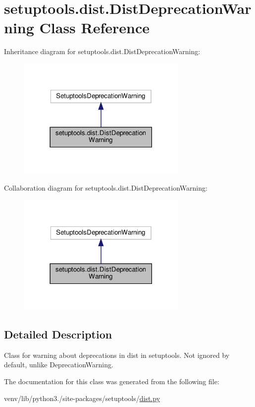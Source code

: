 \hypertarget{classsetuptools_1_1dist_1_1DistDeprecationWarning}{}\section{setuptools.\+dist.\+Dist\+Deprecation\+Warning Class Reference}
\label{classsetuptools_1_1dist_1_1DistDeprecationWarning}


Inheritance diagram for setuptools.\+dist.\+Dist\+Deprecation\+Warning\+:
\nopagebreak
\begin{figure}[H]
\begin{center}
\leavevmode
\includegraphics[width=234pt]{classsetuptools_1_1dist_1_1DistDeprecationWarning__inherit__graph}
\end{center}
\end{figure}


Collaboration diagram for setuptools.\+dist.\+Dist\+Deprecation\+Warning\+:
\nopagebreak
\begin{figure}[H]
\begin{center}
\leavevmode
\includegraphics[width=234pt]{classsetuptools_1_1dist_1_1DistDeprecationWarning__coll__graph}
\end{center}
\end{figure}


\subsection{Detailed Description}
\begin{DoxyVerb}Class for warning about deprecations in dist in
setuptools. Not ignored by default, unlike DeprecationWarning.\end{DoxyVerb}
 

The documentation for this class was generated from the following file\+:\begin{DoxyCompactItemize}
\item 
venv/lib/python3./site-\/packages/setuptools/\hyperlink{dist_8py}{dist.\+py}\end{DoxyCompactItemize}
